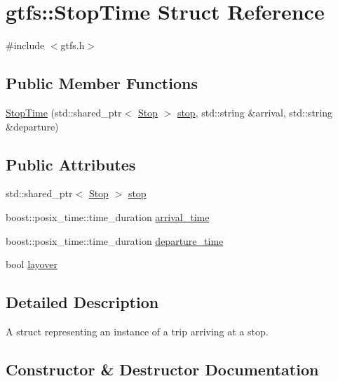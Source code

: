 \hypertarget{structgtfs_1_1StopTime}{}\section{gtfs\+:\+:Stop\+Time Struct Reference}
\label{structgtfs_1_1StopTime}


{\ttfamily \#include $<$gtfs.\+h$>$}

\subsection*{Public Member Functions}
\begin{DoxyCompactItemize}
\item 
\hyperlink{structgtfs_1_1StopTime_adb27c1b3ad66cdc37e4a78338ad2b1a5}{Stop\+Time} (std\+::shared\+\_\+ptr$<$ \hyperlink{classgtfs_1_1Stop}{Stop} $>$ \hyperlink{structgtfs_1_1StopTime_a586702c54a1ad350d486c6639558b4ca}{stop}, std\+::string \&arrival, std\+::string \&departure)
\end{DoxyCompactItemize}
\subsection*{Public Attributes}
\begin{DoxyCompactItemize}
\item 
std\+::shared\+\_\+ptr$<$ \hyperlink{classgtfs_1_1Stop}{Stop} $>$ \hyperlink{structgtfs_1_1StopTime_a586702c54a1ad350d486c6639558b4ca}{stop}
\item 
boost\+::posix\+\_\+time\+::time\+\_\+duration \hyperlink{structgtfs_1_1StopTime_a994ec898edd96675200f759acd76a57c}{arrival\+\_\+time}
\item 
boost\+::posix\+\_\+time\+::time\+\_\+duration \hyperlink{structgtfs_1_1StopTime_ad11c398eca36ff99f0934883141de3c9}{departure\+\_\+time}
\item 
bool \hyperlink{structgtfs_1_1StopTime_af8cc780329a837a49a5d6af60b74b9bf}{layover}
\end{DoxyCompactItemize}


\subsection{Detailed Description}
A struct representing an instance of a trip arriving at a stop. 

\subsection{Constructor \& Destructor Documentation}
